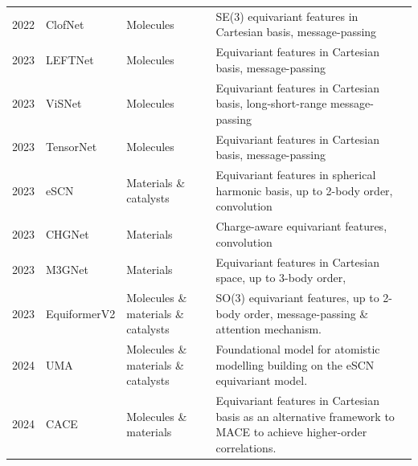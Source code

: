 \begin{longtable}{p{1.25cm}p{2.5cm}p{3cm}p{10.25cm}}
\footnotesize{2022} &
\footnotesize{ClofNet\cite{du2022se}} &
\footnotesize{Molecules} &
\footnotesize{SE(3) equivariant features in Cartesian basis, message-passing}\\

\footnotesize{2023} &
\footnotesize{LEFTNet\cite{du2023new}} &
\footnotesize{Molecules} &
\footnotesize{Equivariant features in Cartesian basis, message-passing}\\

\footnotesize{2023} &
\footnotesize{ViSNet\cite{li2024long}} &
\footnotesize{Molecules} &
\footnotesize{Equivariant features in Cartesian basis, long-short-range message-passing}\\

\footnotesize{2023} &
\footnotesize{TensorNet\cite{simeon2023tensornet}} &
\footnotesize{Molecules} &
\footnotesize{Equivariant features in Cartesian basis, message-passing}\\

\footnotesize{2023} &
\footnotesize{eSCN\cite{passaro2023reducing}} &
\footnotesize{Materials \& catalysts} &
\footnotesize{Equivariant features in spherical harmonic basis, up to 2-body order, convolution}\\

\footnotesize{2023} &
\footnotesize{CHGNet\cite{deng2023chgnet}} &
\footnotesize{Materials} &
\footnotesize{Charge-aware equivariant features, convolution}\\

\footnotesize{2023} &
\footnotesize{M3GNet\cite{chen2022universal}} &
\footnotesize{Materials} &
\footnotesize{Equivariant features in Cartesian space, up to 3-body order, }\\

\footnotesize{2023} &
\footnotesize{EquiformerV2\cite{liao2024equiformerv2}} &
\footnotesize{Molecules \& materials \& catalysts} &
\footnotesize{SO(3) equivariant features, up to 2-body order, message-passing \& attention mechanism.}\\

\footnotesize{2024} &
\footnotesize{UMA\cite{wood2026family}} &
\footnotesize{Molecules \& materials \& catalysts} &
\footnotesize{Foundational model for atomistic modelling building on the eSCN equivariant model.}\\

\footnotesize{2024} &
\footnotesize{CACE\cite{cheng2024cartesian}} &
\footnotesize{Molecules \& materials}&
\footnotesize{Equivariant features in Cartesian basis as an alternative framework to MACE  to achieve higher-order correlations.}\\


\end{longtable}
